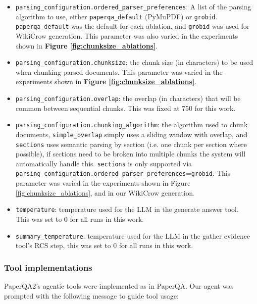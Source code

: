 \begin{itemize}
\item \texttt{parsing\_configuration.ordered\_parser\_preferences}: A list of the parsing algorithm to use, either \texttt{paperqa\_default} (PyMuPDF) or \texttt{grobid}. \texttt{paperqa\_default} was the default for each ablation, and \texttt{grobid} was used for WikiCrow generation. This parameter was also varied in the experiments shown in \textbf{Figure \ref{fig:chunksize_ablations}}. 
\item \texttt{parsing\_configuration.chunksize}: the chunk size (in characters) to be used when chunking parsed documents. This parameter was varied in the experiments shown in \textbf{Figure \ref{fig:chunksize_ablations}}.
\item \texttt{parsing\_configuration.overlap}: the overlap (in characters) that will be common between sequential chunks. This was fixed at 750 for this work. 
\item \texttt{parsing\_configuration.chunking\_algorithm}: the algorithm used to chunk documents, \texttt{simple\_overlap} simply uses a sliding window with overlap, and \texttt{sections} uses semantic parsing by section (i.e. one chunk per section where possible), if sections need to be broken into multiple chunks the system will automatically handle this. \texttt{sections} is only supported via \texttt{parsing\_configuration.ordered\_parser\_preferences}=\texttt{grobid}. This parameter was varied in the experiments shown in {Figure \ref{fig:chunksize_ablations}}, and in our WikiCrow generation.
\item \texttt{temperature}: temperature used for the LLM in the generate answer tool.  This was set to 0 for all runs in this work.
\item \texttt{summary\_temperature}: temperature used for the LLM in the gather evidence tool's RCS step, this was set to 0 for all runs in this work.
\end{itemize}

\subsubsection{Tool implementations} \label{sec:cit-trav}

PaperQA2's agentic tools were implemented as in PaperQA\cite{lala2023paperqa}. Our agent was prompted with the following message to guide tool usage: 

